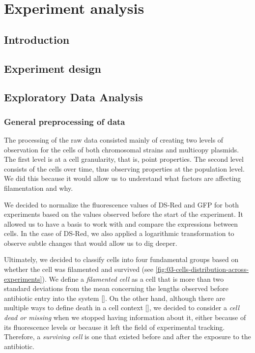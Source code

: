 \documentclass[a4paper, nobind]{templates/ociamthesis}
\begin{document}
\adjustmtc
{}

\hypertarget{experiment-analysis}{%
\chapter{Experiment analysis}\label{experiment-analysis}}

\minitoc 

\hypertarget{introduction-1}{%
\section{Introduction}\label{introduction-1}}

\hypertarget{experiment-design}{%
\section{Experiment design}\label{experiment-design}}

\hypertarget{exploratory-data-analysis}{%
\section{Exploratory Data Analysis}\label{exploratory-data-analysis}}

\hypertarget{general-preprocessing-of-data}{%
\subsection{General preprocessing of data}\label{general-preprocessing-of-data}}

The processing of the raw data consisted mainly of creating two levels of observation for the cells of both chromosomal strains and multicopy plasmids.
The first level is at a cell granularity, that is, point properties.
The second level consists of the cells over time, thus observing properties at the population level.
We did this because it would allow us to understand what factors are affecting filamentation and why.

We decided to normalize the fluorescence values of DS-Red and GFP for both experiments based on the values observed before the start of the experiment.
It allowed us to have a basis to work with and compare the expressions between cells.
In the case of DS-Red, we also applied a logarithmic transformation to observe subtle changes that would allow us to dig deeper.

Ultimately, we decided to classify cells into four fundamental groups based on whether the cell was filamented and survived (see \ref{fig:03-cells-distribution-across-experiments}).
We define a \emph{filamented cell} as a cell that is more than two standard deviations from the mean concerning the lengths observed before antibiotic entry into the system {[}{]}.
On the other hand, although there are multiple ways to define death in a cell context {[}{]}, we decided to consider a \emph{cell dead or missing} when we stopped having information about it, either because of its fluorescence levels or because it left the field of experimental tracking.
Therefore, a \emph{surviving cell} is one that existed before and after the exposure to the antibiotic.
\end{document}
